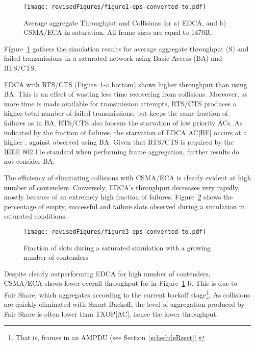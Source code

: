 \documentclass[a4paper]{article}
\begin{document}
	\begin{figure}[t]
		\centering
			\texttt{[image: revisedFigures/figure1-eps-converted-to.pdf]}
			\caption{Average aggregate Throughput and Collisions for a) EDCA, and b) CSMA/ECA in saturation. All frame sizes are equal to 1470B.}
			\label{fig:multiplotSat}
	\end{figure}

Figure~\ref{fig:multiplotSat} gathers the simulation results for average aggregate throughput (S) and failed transmissions in a saturated network using Basic Access (BA) and RTS/CTS. 

EDCA with RTS/CTS (Figure~\ref{fig:multiplotSat}-a bottom) shows higher throughput than using BA. This is an effect of wasting less time recovering from collisions. Moreover, as more time is made available for transmission attempts, RTS/CTS produces a higher total number of failed transmissions, but keeps the same fraction of failures as in BA. RTS/CTS also loosens the starvation of low priority ACs. As indicated by the fraction of failures, the starvation of EDCA AC[BE] occurs at a higher , against  observed using BA. Given that RTS/CTS is required by the IEEE 802.11e standard when performing frame aggregation, further results do not consider BA.

The efficiency of eliminating collisions with CSMA/ECA is clearly evident at high number of contenders. Conversely, EDCA's throughput decreases very rapidly, mostly because of an extremely high fraction of failures. Figure~\ref{fig:slots} shows the percentage of empty, successful and failure slots observed during a simulation in saturated conditions.

 	\begin{figure}[t]
	\centering
		\texttt{[image: revisedFigures/figure3-eps-converted-to.pdf]}
		\caption{Fraction of slots during a saturated simulation with a growing number of contenders}
		\label{fig:slots}
	\end{figure}


Despite clearly outperforming EDCA for high number of contenders, CSMA/ECA shows lower overall throughput for  in Figure~\ref{fig:multiplotSat}-b. This is due to Fair Share, which aggregates according to the current backoff stage\footnote{That is,  frames in an AMPDU (see Section~\ref{scheduleReset}).}. As collisions are quickly eliminated with Smart Backoff, the level of aggregation produced by Fair Share is often lower than TXOP[AC], hence the lower throughput.
\end{document}
